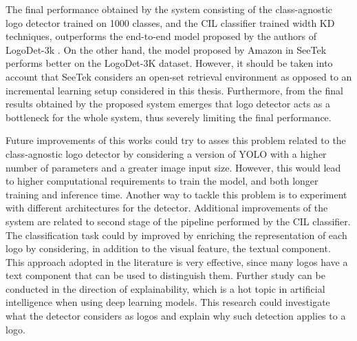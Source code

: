 The final performance obtained by the system consisting of the class-agnostic logo detector trained on 1000 classes, and the CIL classifier trained width KD techniques, outperforms the end-to-end model proposed by the authors of LogoDet-3k \cite{wang2022logodet}.
On the other hand, the model proposed by Amazon in SeeTek \cite{li2022seetek} performs better on the LogoDet-3K dataset. However, it should be taken into account that SeeTek considers an open-set retrieval environment as opposed to an incremental learning setup considered in this thesis.
Furthermore, from the final results obtained by the proposed system emerges that logo detector acts as a bottleneck for the whole system, thus severely limiting the final performance.

Future improvements of this works could try to asses this problem related to the class-agnostic logo detector by considering a version of YOLO with a higher number of parameters and a greater image input size. However, this would lead to higher computational requirements to train the model, and both longer training and inference time. Another way to tackle this problem is to experiment with different architectures for the detector.
Additional improvements of the system are related to second stage of the pipeline performed by the CIL classifier.
The classification task could by improved by enriching the representation of each logo by considering, in addition to the visual feature, the textual component.
This approach adopted in the literature is very effective, since many logos have a text component that can be used to distinguish them. Further study can be conducted in the direction of explainability, which is a hot topic in artificial intelligence when using deep learning models. This research could investigate what the detector considers as logos and explain why such detection applies to a logo.
